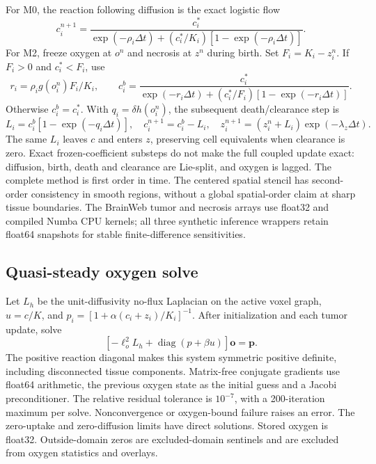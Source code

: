 For M0, the reaction following diffusion is the exact logistic flow
\begin{equation}
 c_i^{n+1}=\frac{c_i^*}{\exp(-\rho_i\Delta t)+(c_i^*/K_i)[1-\exp(-\rho_i\Delta t)]}.
\end{equation}
For M2, freeze oxygen at $o^n$ and necrosis at $z^n$ during birth. Set $F_i=K_i-z_i^n$. If $F_i>0$ and $c_i^*<F_i$, use
\begin{equation}
 r_i=\rho_i g(o_i^n)F_i/K_i,\qquad
 c_i^b=\frac{c_i^*}{\exp(-r_i\Delta t)+(c_i^*/F_i)[1-\exp(-r_i\Delta t)]}.
\end{equation}
Otherwise $c_i^b=c_i^*$. With $q_i=\delta h(o_i^n)$, the subsequent death/clearance step is
\begin{equation}
 L_i=c_i^b[1-\exp(-q_i\Delta t)],\quad
 c_i^{n+1}=c_i^b-L_i,\quad
 z_i^{n+1}=(z_i^n+L_i)\exp(-\lambda_z\Delta t).
\end{equation}
The same $L_i$ leaves $c$ and enters $z$, preserving cell equivalents when clearance is zero. Exact frozen-coefficient substeps do not make the full coupled update exact: diffusion, birth, death and clearance are Lie-split, and oxygen is lagged. The complete method is first order in time. The centered spatial stencil has second-order consistency in smooth regions, without a global spatial-order claim at sharp tissue boundaries. The BrainWeb tumor and necrosis arrays use float32 and compiled Numba CPU kernels; all three synthetic inference wrappers retain float64 snapshots for stable finite-difference sensitivities.

\subsection{Quasi-steady oxygen solve}
Let $L_h$ be the unit-diffusivity no-flux Laplacian on the active voxel graph, $u=c/K$, and $p_i=[1+\alpha(c_i+z_i)/K_i]^{-1}$. After initialization and each tumor update, solve
\begin{equation}
 \left[-\ell_o^2L_h+\operatorname{diag}(p+\beta u)\right]\bm{o}=\bm{p}.
\end{equation}
The positive reaction diagonal makes this system symmetric positive definite, including disconnected tissue components. Matrix-free conjugate gradients use float64 arithmetic, the previous oxygen state as the initial guess and a Jacobi preconditioner. The relative residual tolerance is $10^{-7}$, with a 200-iteration maximum per solve. Nonconvergence or oxygen-bound failure raises an error. The zero-uptake and zero-diffusion limits have direct solutions. Stored oxygen is float32. Outside-domain zeros are excluded-domain sentinels and are excluded from oxygen statistics and overlays.


